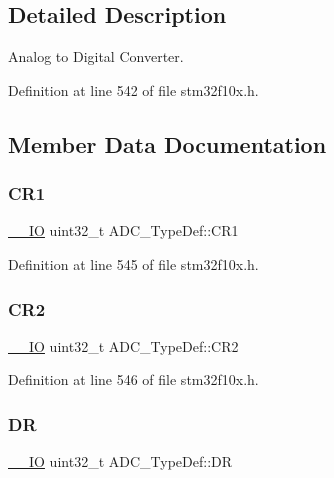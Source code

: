 \subsection{Detailed Description}
Analog to Digital Converter. 

Definition at line 542 of file stm32f10x.\+h.



\subsection{Member Data Documentation}
\mbox{\label{struct_a_d_c___type_def_a89b1ff4376683dd2896ea8b32ded05b2}} 
\subsubsection{\texorpdfstring{C\+R1}{CR1}}
{\footnotesize\ttfamily \hyperlink{core__sc300_8h_aec43007d9998a0a0e01faede4133d6be}{\+\_\+\+\_\+\+IO} uint32\+\_\+t A\+D\+C\+\_\+\+Type\+Def\+::\+C\+R1}



Definition at line 545 of file stm32f10x.\+h.

\mbox{\label{struct_a_d_c___type_def_a1053a65a21af0d27afe1bf9cf7b7aca7}} 
\subsubsection{\texorpdfstring{C\+R2}{CR2}}
{\footnotesize\ttfamily \hyperlink{core__sc300_8h_aec43007d9998a0a0e01faede4133d6be}{\+\_\+\+\_\+\+IO} uint32\+\_\+t A\+D\+C\+\_\+\+Type\+Def\+::\+C\+R2}



Definition at line 546 of file stm32f10x.\+h.

\mbox{\label{struct_a_d_c___type_def_a84114accead82bd11a0e12a429cdfed9}} 
\subsubsection{\texorpdfstring{DR}{DR}}
{\footnotesize\ttfamily \hyperlink{core__sc300_8h_aec43007d9998a0a0e01faede4133d6be}{\+\_\+\+\_\+\+IO} uint32\+\_\+t A\+D\+C\+\_\+\+Type\+Def\+::\+DR}



